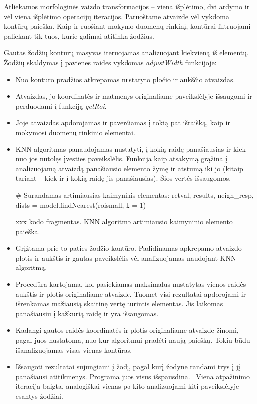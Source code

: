 \documentclass[a4paper,12pt]{article}
\begin{document}
Atliekamos morfologinės vaizdo transformacijos – viena išplėtimo, dvi ardymo ir vėl viena išplėtimo operacijų iteracijos. Paruoštame atvaizde vėl vykdoma kontūrų paieška. Kaip ir ruošiant mokymo duomenų rinkinį, kontūrai filtruojami paliekant tik tuos, kurie galimai atitinka žodžius. 

Gautas žodžių kontūrų masyvas iteruojamas analizuojant kiekvieną iš elementų. Žodžių skaldymas į pavienes raides vykdomas \textit{adjustWidth} funkcijoje:
\begin{itemize}
	\item Nuo kontūro pradžios atkrepamas nustatyto pločio ir aukščio atvaizdas.
	\item Atvaizdas, jo koordinatės ir matmenys originaliame paveikslėlyje išsaugomi ir perduodami į funkciją \textit{getRoi}.
	\item Joje atvaizdas apdorojamas ir paverčiamas į tokią pat išraišką, kaip ir mokymosi duomenų rinkinio elementai.
	\item KNN algoritmas panaudojamas nustatyti, į kokią raidę panašiausias ir kiek nuo jos nutolęs įvesties paveikslėlis. Funkcija kaip atsakymą grąžina į analizuojamą atvaizdą panašiausio elemento žymę ir atstumą iki jo (kitaip tariant – kiek ir į kokią raidę jis panašiausias). Šios vertės išsaugomos.
	 \begin{listing}[H]
	 	\begin{pythoncode}
# Surandamas artimiausias kaimyninis elementas:
retval, results, neigh_resp, dists = model.findNearest(roismall, k = 1)
	 	\end{pythoncode}
	 	\begin{center}
	 		xxx kodo fragmentas. KNN algoritmo artimiausio kaimyninio elemento paieška.
	 	\end{center}		
	 \end{listing}
	 \item Grįžtama prie to paties žodžio kontūro. Padidinamas apkrepamo atvaizdo plotis ir aukštis ir gautas paveikslėlis vėl analizuojamas naudojant KNN algoritmą.
	 \item Procedūra kartojama, kol pasiekiamas maksimalus nustatytas vienos raidės aukštis ir plotis originaliame atvaizde. Tuomet visi rezultatai apdorojami ir išrenkamas mažiausią skaitinę vertę turintis elementas. Jis laikomas panašiausiu į kažkurią raidę ir yra išsaugomas.
	 \item Kadangi gautos raidės koordinatės ir plotis originaliame atvaizde žinomi, pagal juos nustatoma, nuo kur algoritmui pradėti naują paiešką. Tokiu būdu išanalizuojamas visas vienas kontūras.
	 \item Išsaugoti rezultatai sujungiami į žodį, pagal kurį žodyne randami trys į jį panašiausi atitikmenys. Programa juos visus išspausdina.
	 \ Viena atpažinimo iteracija baigta, analogiškai vienas po kito analizuojami kiti paveikslėlyje esantys žodžiai.
\end{itemize} 
 
\end{document}
